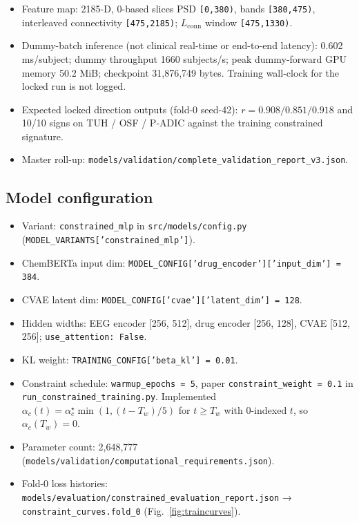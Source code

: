 \begin{itemize}
  \item Feature map: 2185-D, 0-based slices PSD \texttt{[0,380)}, bands \texttt{[380,475)}, interleaved connectivity \texttt{[475,2185)}; \(L_{\mathrm{conn}}\) window \texttt{[475,1330)}.
  \item Dummy-batch inference (not clinical real-time or end-to-end latency): 0.602 ms/subject; dummy throughput 1660 subjects/s; peak dummy-forward GPU memory 50.2 MiB; checkpoint 31,876,749 bytes. Training wall-clock for the locked run is not logged.
  \item Expected locked direction outputs (fold-0 seed-42): \(r = 0.908 / 0.851 / 0.918\) and 10/10 signs on TUH / OSF / P-ADIC against the training constrained signature.
  \item Master roll-up: \texttt{models/\allowbreak{}validation/\allowbreak{}complete\_\allowbreak{}validation\_\allowbreak{}report\_\allowbreak{}v3.\allowbreak{}json}.
\end{itemize}

\subsection{Model configuration}

\begin{itemize}
  \item Variant: \texttt{constrained\_\allowbreak{}mlp} in \texttt{src/\allowbreak{}models/\allowbreak{}config.\allowbreak{}py} (\texttt{MODEL\_\allowbreak{}VARIANTS['constrained\_\allowbreak{}mlp']}).
  \item ChemBERTa input dim: \texttt{MODEL\_\allowbreak{}CONFIG['drug\_\allowbreak{}encoder']['input\_\allowbreak{}dim'] = 384}.
  \item CVAE latent dim: \texttt{MODEL\_\allowbreak{}CONFIG['cvae']['latent\_\allowbreak{}dim'] = 128}.
  \item Hidden widths: EEG encoder [256, 512], drug encoder [256, 128], CVAE [512, 256]; \texttt{use\_\allowbreak{}attention: False}.
  \item KL weight: \texttt{TRAINING\_\allowbreak{}CONFIG['beta\_\allowbreak{}kl'] = 0.\allowbreak{}01}.
  \item Constraint schedule: \texttt{warmup\_\allowbreak{}epochs = 5}, paper \texttt{constraint\_\allowbreak{}weight = 0.\allowbreak{}1} in \texttt{run\_\allowbreak{}constrained\_\allowbreak{}training.\allowbreak{}py}. Implemented \(\alpha_c(t)=\alpha_c^{\star}\min(1,(t-T_w)/5)\) for \(t\ge T_w\) with 0-indexed \(t\), so \(\alpha_c(T_w)=0\).
  \item Parameter count: 2,648,777 (\texttt{models/\allowbreak{}validation/\allowbreak{}computational\_\allowbreak{}requirements.\allowbreak{}json}).
  \item Fold-0 loss histories: \texttt{models/\allowbreak{}evaluation/\allowbreak{}constrained\_\allowbreak{}evaluation\_\allowbreak{}report.\allowbreak{}json} → \texttt{constraint\_\allowbreak{}curves.\allowbreak{}fold\_\allowbreak{}0} (Fig.~\ref{fig:traincurves}).
\end{itemize}

